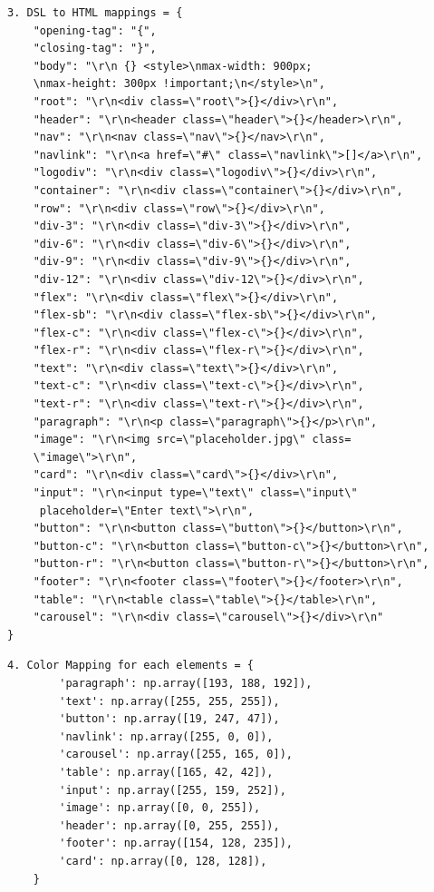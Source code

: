 \begin{verbatim}
3. DSL to HTML mappings = {
    "opening-tag": "{",
    "closing-tag": "}",
    "body": "\r\n {} <style>\nmax-width: 900px;
    \nmax-height: 300px !important;\n</style>\n",
    "root": "\r\n<div class=\"root\">{}</div>\r\n",
    "header": "\r\n<header class=\"header\">{}</header>\r\n",
    "nav": "\r\n<nav class=\"nav\">{}</nav>\r\n",
    "navlink": "\r\n<a href=\"#\" class=\"navlink\">[]</a>\r\n",
    "logodiv": "\r\n<div class=\"logodiv\">{}</div>\r\n",
    "container": "\r\n<div class=\"container\">{}</div>\r\n",
    "row": "\r\n<div class=\"row\">{}</div>\r\n",
    "div-3": "\r\n<div class=\"div-3\">{}</div>\r\n",
    "div-6": "\r\n<div class=\"div-6\">{}</div>\r\n",
    "div-9": "\r\n<div class=\"div-9\">{}</div>\r\n",
    "div-12": "\r\n<div class=\"div-12\">{}</div>\r\n",
    "flex": "\r\n<div class=\"flex\">{}</div>\r\n",
    "flex-sb": "\r\n<div class=\"flex-sb\">{}</div>\r\n",
    "flex-c": "\r\n<div class=\"flex-c\">{}</div>\r\n",
    "flex-r": "\r\n<div class=\"flex-r\">{}</div>\r\n",
    "text": "\r\n<div class=\"text\">{}</div>\r\n",
    "text-c": "\r\n<div class=\"text-c\">{}</div>\r\n",
    "text-r": "\r\n<div class=\"text-r\">{}</div>\r\n",
    "paragraph": "\r\n<p class=\"paragraph\">{}</p>\r\n",
    "image": "\r\n<img src=\"placeholder.jpg\" class=
    \"image\">\r\n",
    "card": "\r\n<div class=\"card\">{}</div>\r\n",
    "input": "\r\n<input type=\"text\" class=\"input\" 
     placeholder=\"Enter text\">\r\n",
    "button": "\r\n<button class=\"button\">{}</button>\r\n",
    "button-c": "\r\n<button class=\"button-c\">{}</button>\r\n",
    "button-r": "\r\n<button class=\"button-r\">{}</button>\r\n",
    "footer": "\r\n<footer class=\"footer\">{}</footer>\r\n",
    "table": "\r\n<table class=\"table\">{}</table>\r\n",
    "carousel": "\r\n<div class=\"carousel\">{}</div>\r\n"
}
\end{verbatim}
\begin{verbatim}
4. Color Mapping for each elements = {
        'paragraph': np.array([193, 188, 192]),
        'text': np.array([255, 255, 255]),
        'button': np.array([19, 247, 47]),
        'navlink': np.array([255, 0, 0]),
        'carousel': np.array([255, 165, 0]),
        'table': np.array([165, 42, 42]),
        'input': np.array([255, 159, 252]),
        'image': np.array([0, 0, 255]),
        'header': np.array([0, 255, 255]),
        'footer': np.array([154, 128, 235]),
        'card': np.array([0, 128, 128]),
    }
    \end{verbatim}
    

\pagebreak




